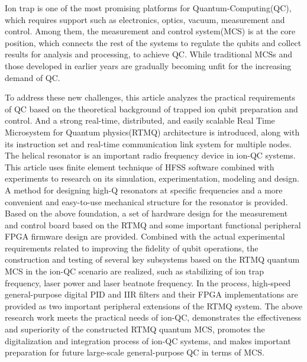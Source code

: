\begin{abstract*}
  Ion trap is one of the most promising platforms for Quantum-Computing(QC), which requires support such as electronics, optics, vacuum, measurement and control. 
  Among them, the measurement and control system(MCS) is at the core position, which connects the rest of the systems to regulate the qubits and collect results for analysis and processing, to achieve QC. 
  While traditional MCSs and those developed in earlier years are gradually becoming unfit for the increasing demand of QC.
 
  To address these new challenges, this article analyzes the practical requirements of QC based on the theoretical background of trapped ion qubit preparation and control. 
  And a strong real-time, distributed, and easily scalable Real Time Microsystem for Quantum physics(RTMQ) architecture is introduced, along with its instruction set and real-time communication link system for multiple nodes. 
  The helical resonator is an important radio frequency device in ion-QC systems. This article uses finite element technique of HFSS software combined with experiments to research on its simulation, experimentation, modeling and design. A method for designing high-Q resonators at specific frequencies and a more convenient and easy-to-use mechanical structure for the resonator is provided. 
  Based on the above foundation, a set of hardware design for the measurement and control board based on the RTMQ and some important functional peripheral FPGA firmware design are provided. 
  Combined with the actual experimental requirements related to improving the fidelity of qubit operations, the construction and testing of several key subsystems based on the RTMQ quantum MCS in the ion-QC scenario are realized, such as stabilizing of ion trap frequency, laser power and laser beatnote frequency. 
  In the process, high-speed general-purpose digital PID and IIR filters and their FPGA implementations are provided as two important peripheral extensions of the RTMQ system. 
  The above research work meets the practical needs of ion-QC, demonstrates the effectiveness and superiority of the constructed RTMQ quantum MCS, promotes the digitalization and integration process of ion-QC systems, and makes important preparation for future large-scale general-purpose QC in terms of MCS.


\end{abstract*}
